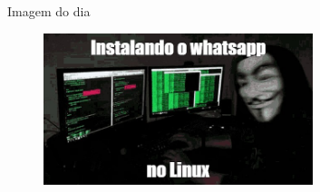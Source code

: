 \documentclass{beamer}
\begin{document}
\begin{frame}[fragile]{Imagem do dia}

	\begin{figure}[H]
		\centerline{\includegraphics[width=0.7\textwidth]{assets/imagem-do-dia/terminal-hascker.jpg}}

	\end{figure}
\end{frame}


\footlinecolor{}

\backmatter
\end{document}
